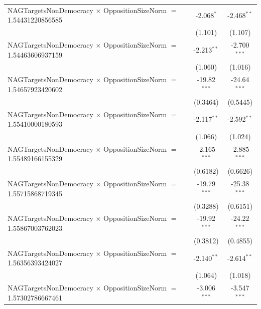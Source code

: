 \begin{tabular}{lcc}
   NAGTargetsNonDemocracy $\times$ OppositionSizeNorm $=$ 1.54431220856585      & -2.068$^{*}$         & -2.468$^{**}$\\   
                                                                                & (1.101)              & (1.107)\\   
   NAGTargetsNonDemocracy $\times$ OppositionSizeNorm $=$ 1.54463606937159      & -2.213$^{**}$        & -2.700$^{***}$\\   
                                                                                & (1.060)              & (1.016)\\   
   NAGTargetsNonDemocracy $\times$ OppositionSizeNorm $=$ 1.54657923420602      & -19.82$^{***}$       & -24.64$^{***}$\\   
                                                                                & (0.3464)             & (0.5445)\\   
   NAGTargetsNonDemocracy $\times$ OppositionSizeNorm $=$ 1.55410000180593      & -2.117$^{**}$        & -2.592$^{**}$\\   
                                                                                & (1.066)              & (1.024)\\   
   NAGTargetsNonDemocracy $\times$ OppositionSizeNorm $=$ 1.55489166155329      & -2.165$^{***}$       & -2.885$^{***}$\\   
                                                                                & (0.6182)             & (0.6626)\\   
   NAGTargetsNonDemocracy $\times$ OppositionSizeNorm $=$ 1.55715868719345      & -19.79$^{***}$       & -25.38$^{***}$\\   
                                                                                & (0.3288)             & (0.6151)\\   
   NAGTargetsNonDemocracy $\times$ OppositionSizeNorm $=$ 1.55867003762023      & -19.92$^{***}$       & -24.22$^{***}$\\   
                                                                                & (0.3812)             & (0.4855)\\   
   NAGTargetsNonDemocracy $\times$ OppositionSizeNorm $=$ 1.56356393424027      & -2.140$^{**}$        & -2.614$^{**}$\\   
                                                                                & (1.064)              & (1.018)\\   
   NAGTargetsNonDemocracy $\times$ OppositionSizeNorm $=$ 1.57302786667461      & -3.006$^{***}$       & -3.547$^{***}$\\   

\end{tabular}
